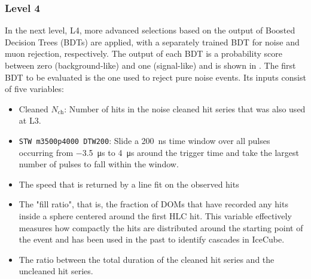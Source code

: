 \subsubsection{Level 4}
\label{sec:level4-selection}
In the next level, L4, more advanced selections based on the output of Boosted Decision Trees (BDTs) are applied, with a separately trained BDT for noise and muon rejection, respectively.
The output of each BDT is a probability score between zero (background-like) and one (signal-like) and is shown in .
The first BDT to be evaluated is the one used to reject pure noise events.
Its inputs consist of five variables:
\begin{itemize}
    \item Cleaned $N_\mathrm{ch}$: Number of hits in the noise cleaned hit series that was also used at L3.
    \item \texttt{STW m3500p4000 DTW200}: Slide a \SI{200}{\nano\second} time window over all pulses occurring from \SI{-3.5}{\micro\second} to \SI{4}{\micro\second} around the trigger time and take the largest number of pulses to fall within the window.
    \item The speed that is returned by a line fit on the observed hits
    \item The "fill ratio", that is, the fraction of DOMs that have recorded any hits inside a sphere centered around the first HLC hit.
    This variable effectively measures how compactly the hits are distributed around the starting point of the event and has been used in the past to identify cascades in IceCube\cite{icecube_2011}.
    \item The ratio between the total duration of the cleaned hit series and the uncleaned hit series.
\end{itemize}
